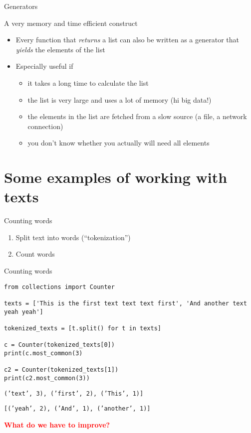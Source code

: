 \documentclass[compress]{beamer}
\begin{document}
\begin{frame}[fragile]{Generators}
	\begin{alertblock}{A very memory and time efficient construct}
		\begin{itemize}
			\item Every function that \emph{returns} a list can also be written as a generator that \emph{yields} the elements of the list
			\item Especially useful if
			\begin{itemize}
				\item it takes a long time to calculate the list
				\item the list is very large and uses a lot of memory (hi big data!)
				\item the elements in the list are fetched from a slow source (a file, a network connection)
				\item you don't know whether you actually will need all elements
			\end{itemize}
		\end{itemize}

		\end{alertblock}

		\end{frame}












\section{Some examples of working with texts}



\begin{frame}{Counting words}
\begin{enumerate}
	\item Split text into words (``tokenization'')
	\item Count words
\end{enumerate}
\end{frame}

\begin{frame}[fragile]{Counting words}
\begin{lstlisting}
from collections import Counter

texts = ['This is the first text text text first', 'And another text yeah yeah']

tokenized_texts = [t.split() for t in texts] 

c = Counter(tokenized_texts[0]) 
print(c.most_common(3) 

c2 = Counter(tokenized_texts[1]) 
print(c2.most_common(3)) 

\end{lstlisting}

\texttt{('text', 3), ('first', 2), ('This', 1)]}

\texttt{[('yeah', 2), ('And', 1), ('another', 1)]}

\pause

\textbf{\textcolor{red}{What do we have to improve?}}

\end{frame}
\end{document}
